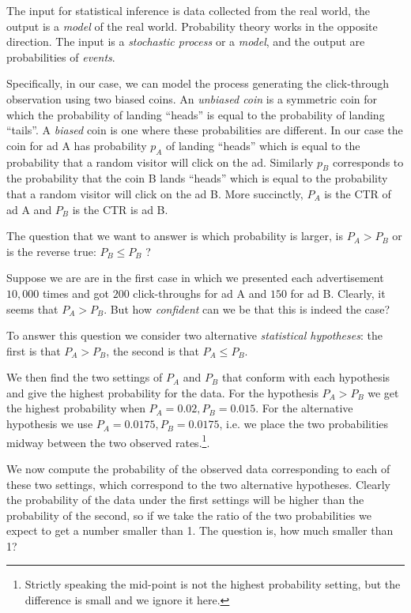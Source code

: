 The input for statistical inference is data collected from the real
world, the output is a {\em model} of the real world. Probability
theory works in the opposite direction. The input is a {\em stochastic
  process} or a {\em model}, and the output are probabilities of {\em
  events}.

Specifically, in our case, we can model the process generating the
click-through observation using two biased coins. An {\em unbiased
  coin} is a symmetric coin for which the probability of landing
``heads'' is equal to the probability of landing ``tails''.  A {\em
  biased} coin is one where these probabilities are different.  In our
case the coin for ad A has probability $p_A$ of landing ``heads''
which is equal to the probability that a random visitor will click on
the ad. Similarly $p_B$ corresponds to the probability that the coin B
lands ``heads'' which is equal to the probability that a random
visitor will click on the ad B. More succinctly, $P_A$ is the CTR of
ad A and $P_B$ is the CTR is ad B.

The question that we want to answer is which probability is larger, is
$P_A>P_B$ or is the reverse true: $P_B \leq P_B$ ?

Suppose we are are in the first case in which we presented each
advertisement $10,000$ times and got $200$ click-throughs for ad A and
$150$ for ad B. Clearly, it seems that $P_A>P_B$. But how {\em
  confident} can we be that this is indeed the case?

To answer this question we consider two alternative {\em statistical
hypotheses}: the first is that $P_A>P_B$, the second is that $P_A
\leq P_B$. 

We then find the two settings of $P_A$ and $P_B$ that conform with
each hypothesis and give the highest probability for the data.  For
the hypothesis $P_A>P_B$ we get the highest probability when
$P_A=0.02,P_B=0.015$. For the alternative hypothesis we use
$P_A=0.0175,P_B=0.0175$, i.e. we place the two probabilities midway
between the two observed rates.\footnote{Strictly speaking the
  mid-point is not the highest probability setting, but the difference
  is small and we ignore it here.}.

We now compute the probability of the observed data corresponding to
each of these two settings, which correspond to the two alternative
hypotheses. Clearly the probability of the data under the first
settings will be higher than the probability of the second, so if we
take the ratio of the two probabilities we expect to get a number
smaller than 1. The question is, how much smaller than 1?


